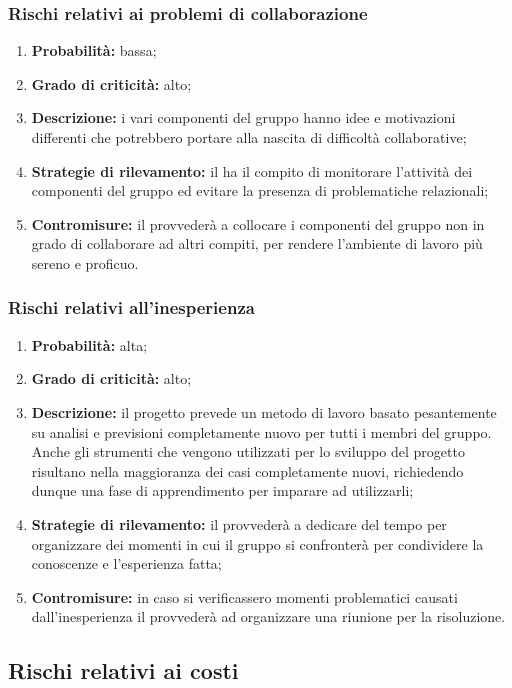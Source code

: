\subsubsection{Rischi relativi ai problemi di collaborazione}
\begin{enumerate}
	\item \textbf{Probabilità:} bassa;
	\item \textbf{Grado di criticità:} alto;
	\item \textbf{Descrizione:} i vari componenti del gruppo hanno idee e motivazioni differenti che potrebbero portare alla nascita di difficoltà collaborative;
	\item \textbf{Strategie di rilevamento:} il \Responsabile{} ha il compito di monitorare l’attività dei componenti del gruppo ed evitare la presenza di problematiche relazionali;
	\item \textbf{Contromisure:} il \Responsabile{} provvederà a collocare i componenti del gruppo non in grado di collaborare ad altri compiti, per rendere l’ambiente di lavoro più sereno e proficuo.
\end{enumerate}

\subsubsection{Rischi relativi all'inesperienza}
\begin{enumerate}
	\item \textbf{Probabilità:} alta;
	\item \textbf{Grado di criticità:} alto;
	\item \textbf{Descrizione:} il progetto prevede un metodo di lavoro basato pesantemente su analisi e previsioni completamente nuovo per tutti i membri del gruppo. Anche gli strumenti che vengono utilizzati per lo sviluppo del progetto risultano nella maggioranza dei casi completamente nuovi, richiedendo dunque una fase di apprendimento per imparare ad utilizzarli;
	\item \textbf{Strategie di rilevamento:} il \Responsabile{} provvederà a dedicare del tempo per organizzare dei momenti in cui il gruppo si confronterà per condividere la conoscenze e l'esperienza fatta;
	\item \textbf{Contromisure:} in caso si verificassero momenti problematici causati dall'inesperienza il \Responsabile{} provvederà ad organizzare una riunione per la risoluzione.
\end{enumerate}

\subsection{Rischi relativi ai costi}
